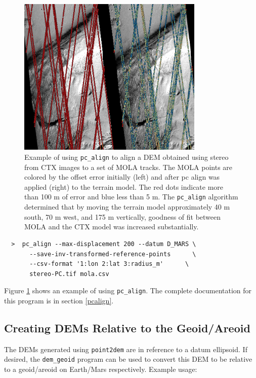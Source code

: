 \begin{figure}
\hfill
\begin{minipage}{3.5in}
\includegraphics[width=3.5in]{images/examples/align_compare.png}
\end{minipage}
\hfill
\begin{minipage}{2in}
\caption[pc-align comparison]{
Example of using \texttt{pc\_align} to align a DEM obtained using stereo
from CTX images to a set of MOLA tracks. The MOLA points are colored by the offset error
initially (left) and after pc align was applied (right)
to the terrain model. The red dots indicate
more than 100 m of error and blue less than 5 m. The
\texttt{pc\_align} algorithm determined that by moving the terrain
model approximately 40 m south, 70 m west, and
175 m vertically, goodness of
fit between MOLA and the CTX model was increased substantially.
}
\label{pc-align-fig}
\end{minipage}
\hfill
\end{figure}

\begin {verbatim}
  >  pc_align --max-displacement 200 --datum D_MARS \
       --save-inv-transformed-reference-points      \
       --csv-format '1:lon 2:lat 3:radius_m'      \
       stereo-PC.tif mola.csv
\end{verbatim}

Figure \ref{pc-align-fig} shows an example of using \texttt{pc\_align}.
The complete documentation for this program is in section
\ref{pcalign}.

\subsection{Creating DEMs Relative to the Geoid/Areoid}

The DEMs generated using \texttt{point2dem} are in reference to a datum
ellipsoid. If desired, the \texttt{dem\_geoid} program can be used to
convert this DEM to be relative to a geoid/areoid on Earth/Mars
respectively. Example usage:

